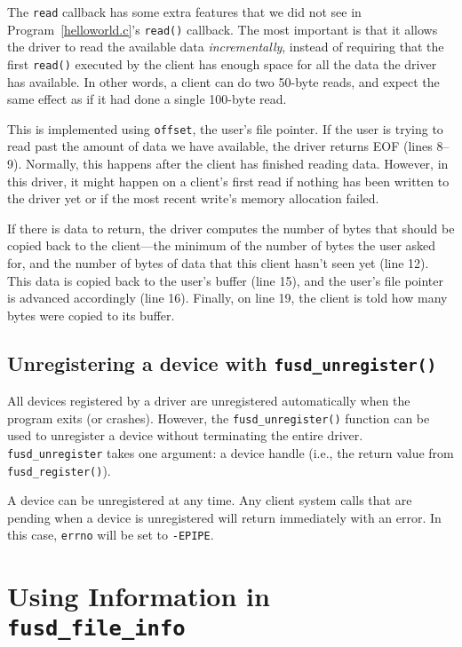 \documentclass{article}
\begin{document}
The {\tt read} callback has some extra features that we did not see in
Program~\ref{helloworld.c}'s {\tt read()} callback.  The most
important is that it allows the driver to read the available data {\em
incrementally}, instead of requiring that the first {\tt read()}
executed by the client has enough space for all the data the driver
has available.  In other words, a client can do two 50-byte reads,
and expect the same effect as if it had done a single 100-byte read.

This is implemented using {\tt *offset}, the user's file pointer.  If
the user is trying to read past the amount of data we have available,
the driver returns EOF (lines 8--9).  Normally, this happens after the
client has finished reading data.  However, in this driver, it might
happen on a client's first read if nothing has been written to the
driver yet or if the most recent write's memory allocation failed.

If there is data to return, the driver computes the number of bytes
that should be copied back to the client---the minimum of the number
of bytes the user asked for, and the number of bytes of data that this
client hasn't seen yet (line 12).  This data is copied back to the
user's buffer (line 15), and the user's file pointer is advanced
accordingly (line 16).  Finally, on line 19, the client is told how
many bytes were copied to its buffer.


\subsection{Unregistering a device with {\tt fusd\_unregister()}}

All devices registered by a driver are unregistered automatically when
the program exits (or crashes).  However, the {\tt fusd\_unregister()}
function can be used to unregister a device without terminating the
entire driver.  {\tt fusd\_unregister} takes one argument: a device
handle (i.e., the return value from {\tt fusd\_register()}).

A device can be unregistered at any time.  Any client system calls
that are pending when a device is unregistered will return immediately
with an error.  In this case, {\tt errno} will be set to {\tt -EPIPE}.


\section{Using Information in {\tt fusd\_file\_info}}
\end{document}

